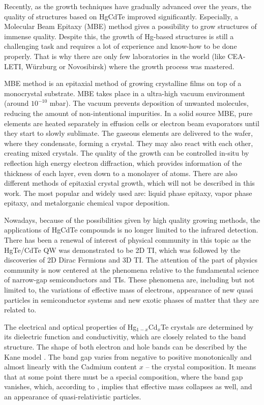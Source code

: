 \documentclass[titlepage,a4paper]{book}
\begin{document}
Recently, as the growth techniques have gradually advanced over the years, the quality of structures based on HgCdTe improved significantly. Especially, a Molecular Beam Epitaxy (MBE) method gives a possibility to grow structures of immense quality. Despite this, the growth of Hg-based structures is still a challenging task and requires a lot of experience and know-how to be done properly. That is why there are only few laboratories in the world (like CEA-LETI, Würzburg or Novosibirsk) where the growth process was mastered.

MBE method is an epitaxial method of growing crystalline films on top of a monocrystal substrate. MBE takes place in a ultra-high vacuum environment (around $10^{-10}$ mbar). The vacuum prevents deposition of unwanted molecules, reducing the amount of non-intentional impurities. In a solid source MBE, pure elements are heated separately in effusion cells or electron beam evaporators until they start to slowly sublimate. The gaseous elements are delivered to the wafer, where they condensate, forming a crystal. They may also react with each other, creating mixed crystals. The quality of the growth can be controlled in-situ by reflection high energy electron diffraction, which provides information of the thickness of each layer, even down to a monolayer of atoms. There are also different methods of epitaxial crystal growth, which will not be described in this work. The most popular and widely used are: liquid phase epitaxy, vapor phase epitaxy, and metalorganic chemical vapor deposition.

Nowadays, because of the possibilities given by high quality growing methods, the applications of HgCdTe compounds is no longer limited to the infrared detection. There has been a renewal of interest of physical community in this topic as the HgTe/CdTe QW was demonstrated to be 2D TI, which was followed by the discoveries of 2D Dirac Fermions and 3D TI. The attention of the part of physics community is now centered at the phenomena relative to the fundamental science of narrow-gap semiconductors and TIs. These phenomena are, including but not limited to, the variations of effective mass of electrons, appearance of new quasi particles in semiconductor systems and new exotic phases of matter that they are related to. 

The electrical and optical properties of Hg$_{1-x}$Cd$_x$Te crystals are determined by its dielectric function and conductivitiy, which are closely related to the band structure. The shape of both electron and hole bands can be described by the Kane model \cite{Kane_Model}. The band gap varies from negative to positive monotonically and almost linearly with the Cadmium content $x$ -- the crystal composition. It means that at some point there must be a special composition, where the band gap vanishes, which, according to \cite{Zawadzki_Topology}, implies that effective mass collapses as well, and an appearance of quasi-relativistic particles. 
\end{document}

